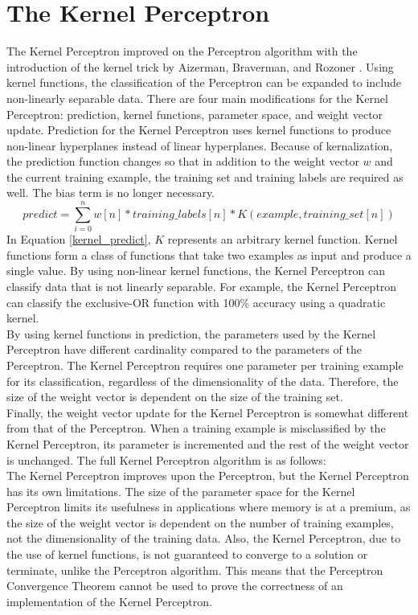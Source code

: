 \section{The Kernel Perceptron}
The Kernel Perceptron improved on the Perceptron algorithm with the introduction of the kernel trick by Aizerman, Braverman, and Rozoner \cite{ABR64}. Using kernel functions, the classification of the Perceptron can be expanded to include non-linearly separable data. There are four main modifications for the Kernel Perceptron: prediction, kernel functions, parameter space, and weight vector update. Prediction for the Kernel Perceptron uses kernel functions to produce non-linear hyperplanes instead of linear hyperplanes. Because of kernalization, the prediction function changes so that in addition to the weight vector $w$ and the current training example, the training set and training labels are required as well. The bias term is no longer necessary.
\begin{equation}\label{kernel_predict}
 predict = \sum_{i=0}^{n} w[n] * training\_labels[n] * K(example, training\_set[n])
\end{equation}
In Equation \ref{kernel_predict}, $K$ represents an arbitrary kernel function. Kernel functions form a class of functions that take two examples as input and produce a single value. By using non-linear kernel functions, the Kernel Perceptron can classify data that is not linearly separable. For example, the Kernel Perceptron can classify the exclusive-OR function with 100\% accuracy
using a quadratic kernel. 
\\By using kernel functions in prediction, the parameters used by the Kernel Perceptron have different cardinality compared to the parameters of the Perceptron. The Kernel Perceptron requires one parameter per training example for its classification, regardless of the dimensionality of the data. Therefore, the size of the weight vector is dependent on the size of the training set. 
\\Finally, the weight vector update for the Kernel Perceptron is somewhat different from that of the Perceptron. When a training example is misclassified by the Kernel Perceptron, its parameter is incremented and the rest of the weight vector is unchanged. The full Kernel Perceptron algorithm is as follows:
\\The Kernel Perceptron improves upon the Perceptron, but the Kernel Perceptron has its own limitations. The size of the parameter space for the Kernel Perceptron limits its usefulness in applications where memory is at a premium, as the size of the weight vector is dependent on the number of training examples, not the dimensionality of the training data. Also, the Kernel Perceptron, due to the use of kernel functions, is not guaranteed to converge to a solution or terminate, unlike the Perceptron algorithm. This means that the Perceptron Convergence Theorem cannot be used to prove the correctness of an implementation of the Kernel Perceptron.
